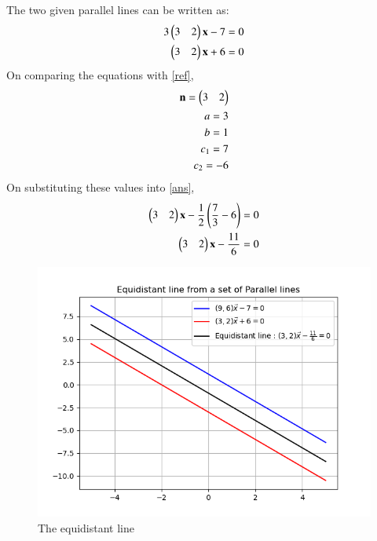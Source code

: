 \documentclass[journal,12pt,twocolumn]{IEEEtran}
\begin{document}
The two given parallel lines can be written as:
\begin{align}
    3\begin{pmatrix}3 & 2\end{pmatrix}\mathbf{x} - 7 = 0\\
    \begin{pmatrix}3 & 2\end{pmatrix}\mathbf{x} + 6 = 0
\end{align}
On comparing the equations with
\eqref{ref},
\begin{align}
    \mathbf{n} = \begin{pmatrix}3 & 2\end{pmatrix}\\
    a = 3\\
    b = 1\\
    c_1 = 7\\
    c_2 = -6
\end{align}
On substituting these values into \eqref{ans},
\begin{align}
    \begin{pmatrix}3 & 2\end{pmatrix}\mathbf{x} - \frac{1}{2}\left(\frac{7}{3} - 6\right) = 0\\
    \begin{pmatrix}3 & 2\end{pmatrix}\mathbf{x} - \frac{11}{6} = 0
\end{align} 
\begin{figure}[!ht]
\centering
 \includegraphics[width=\columnwidth]{graph.png}
 \caption{The equidistant line}
 \end{figure}
\end{document}
